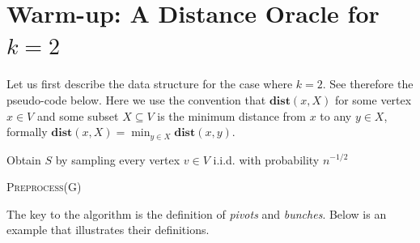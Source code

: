\section{Warm-up: A Distance Oracle for $k=2$}

Let us first describe the data structure for the case where $k=2$. See therefore the pseudo-code below. Here we use the convention that $\mathbf{dist}(x,X)$ for some vertex $x \in V$ and some subset $X \subseteq V$ is the minimum distance from $x$ to any $y \in X$, formally $\mathbf{dist}(x,X) = \min_{y \in X} \mathbf{dist}(x,y)$.

\begin{algorithm}
  \SetAlgoLined
  Obtain $S$ by sampling every vertex $v \in V$ i.i.d. with probability $n^{-1/2}$\;
  
  \caption{\textsc{Preprocess}(G)}
\end{algorithm}

The key to the algorithm is the definition of \emph{pivots} and \emph{bunches}. Below is an example that illustrates their definitions.

